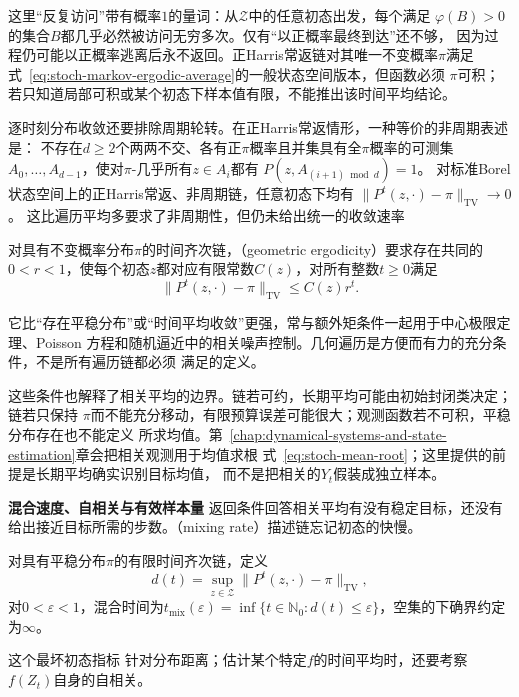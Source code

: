 这里“反复访问”带有概率$1$的量词：从$\mathcal{Z}$中的任意初态出发，每个满足
$\varphi(B)>0$的集合$B$都几乎必然被访问无穷多次。仅有“以正概率最终到达”还不够，
因为过程仍可能以正概率逃离后永不返回。正Harris常返链对其唯一不变概率$\pi$满足
式~\eqref{eq:stoch-markov-ergodic-average}的一般状态空间版本，但函数必须
$\pi$可积；若只知道局部可积或某个初态下样本值有限，不能推出该时间平均结论。

逐时刻分布收敛还要排除周期轮转。在正Harris常返情形，一种等价的非周期表述是：
不存在\(d\geq2\)个两两不交、各有正\(\pi\)概率且并集具有全\(\pi\)概率的可测集
\(A_0,\ldots,A_{d-1}\)，使对\(\pi\)-几乎所有\(z\in A_i\)都有
\(P(z,A_{(i+1)\bmod d})=1\)。
对标准Borel状态空间上的正Harris常返、非周期链，任意初态下均有
\(\|P^t(z,\cdot)-\pi\|_{\mathrm{TV}}\to0\)。
这比遍历平均多要求了非周期性，但仍未给出统一的收敛速率

\begin{definition}[几何遍历性]
  \label{def:stoch-geometric-ergodicity}
  对具有不变概率分布\(\pi\)的时间齐次链，（geometric ergodicity）要求存在共同的$0<r<1$，使每个初态\(z\)都对应有限常数$C(z)$，对所有整数\(t\geq0\)满足
\[
  \lVert P^t(z,\cdot)-\pi\rVert_{\mathrm{TV}}
  \leq C(z)r^t.
\]
\end{definition}
它比“存在平稳分布”或“时间平均收敛”更强，常与额外矩条件一起用于中心极限定理、Poisson
方程和随机逼近中的相关噪声控制。几何遍历是方便而有力的充分条件，不是所有遍历链都必须
满足的定义。

这些条件也解释了相关平均的边界。链若可约，长期平均可能由初始封闭类决定；链若只保持
$\pi$而不能充分移动，有限预算误差可能很大；观测函数若不可积，平稳分布存在也不能定义
所求均值。第~\ref{chap:dynamical-systems-and-state-estimation}章会把相关观测用于均值求根
式~\eqref{eq:stoch-mean-root}；这里提供的前提是长期平均确实识别目标均值，
而不是把相关的$Y_t$假装成独立样本。

\par\medskip\noindent\textbf{混合速度、自相关与有效样本量}\quad
返回条件回答相关平均有没有稳定目标，还没有给出接近目标所需的步数。（mixing rate）描述链忘记初态的快慢。
\begin{definition}[有限链的混合时间]
  \label{def:stoch-finite-mixing-time}
对具有平稳分布\(\pi\)的有限时间齐次链，定义
\[
  d(t)
  =
  \sup_{z\in\mathcal{Z}}
  \lVert P^t(z,\cdot)-\pi\rVert_{\mathrm{TV}},
\]
对\(0<\varepsilon<1\)，混合时间为\(t_{\mathrm{mix}}(\varepsilon)=\inf\{t\in\mathbb N_0:d(t)\leq\varepsilon\}\)，空集的下确界约定为\(\infty\)。
\end{definition}
这个最坏初态指标
针对分布距离；估计某个特定$f$的时间平均时，还要考察$f(Z_t)$自身的自相关。

